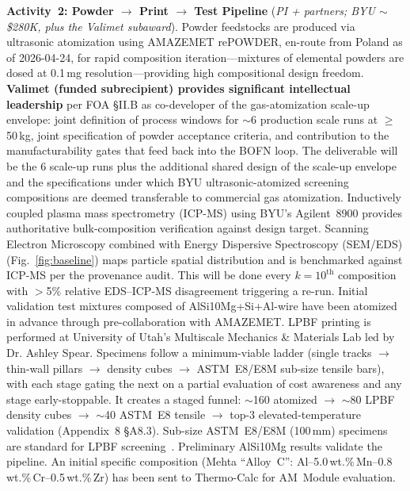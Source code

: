 \documentclass[11pt,letterpaper]{article}
\begin{document}
\textbf{Activity~2: Powder $\to$ Print $\to$ Test Pipeline}
(\emph{PI + partners; BYU {$\sim$}\$280K, plus the Valimet subaward}).
%
Powder feedstocks are produced via ultrasonic atomization using AMAZEMET
rePOWDER, en-route from Poland as of 2026-04-24, for rapid
composition iteration---mixtures of elemental powders are dosed at
0.1\,mg resolution---providing high
compositional design freedom.
\textbf{Valimet (funded subrecipient) provides significant
intellectual leadership} per FOA \S II.B as co-developer of the
gas-atomization scale-up envelope: joint definition of process windows
for $\sim$6 production scale runs at $\geq$50\,kg, joint specification
of powder acceptance criteria,
and contribution to the manufacturability gates that feed back into the
BOFN loop. The deliverable will be the 6 scale-up runs plus the additional shared design of the scale-up envelope and the
specifications under which BYU ultrasonic-atomized screening
compositions are deemed transferable to commercial gas atomization.
Inductively coupled plasma mass spectrometry (ICP-MS) using BYU's Agilent~8900 provides authoritative bulk-composition
verification against design target. Scanning Electron Microscopy combined with Energy Dispersive Spectroscopy (SEM/EDS) (Fig.~\ref{fig:baseline})
maps particle spatial distribution and is benchmarked against
ICP-MS per the provenance audit. This will be done every $k{=}10^{\text{th}}$ composition with
$>$5\% relative EDS--ICP-MS disagreement triggering a re-run. Initial
validation test mixtures composed of AlSi10Mg+Si+Al-wire have been
atomized in advance through pre-collaboration with AMAZEMET.
LPBF printing is performed at University of Utah's Multiscale Mechanics & Materials Lab led by Dr. Ashley Spear. Specimens follow a
minimum-viable ladder (single tracks $\to$ thin-wall pillars $\to$
density cubes $\to$ ASTM~E8/E8M sub-size tensile bars), with each stage
gating the next on a partial evaluation of cost awareness and any stage
early-stoppable. It creates a staged funnel: $\sim$160 atomized $\to$ $\sim$80 LPBF
density cubes
$\to$ $\sim$40 ASTM~E8
tensile $\to$ top-3 elevated-temperature validation
(Appendix~8 \S A8.3).
Sub-size ASTM~E8/E8M (100\,mm) specimens are standard for LPBF
screening~\cite{paraschiv_2023_ma16144930,wang_2020_17452759}.
Preliminary AlSi10Mg results validate the pipeline. An initial specific
composition (Mehta ``Alloy~C'':
Al--5.0\,wt.\%\,Mn--0.8\,wt.\%\,Cr--0.5\,wt.\%\,Zr) has been sent to
Thermo-Calc for AM~Module evaluation.
\end{document}
